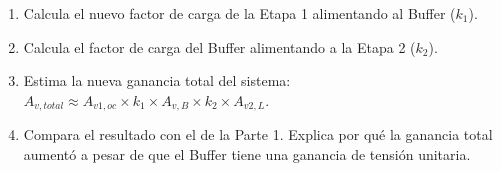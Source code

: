\documentclass[11pt, a4paper]{article}
\begin{document}
\begin{enumerate}
    \item Calcula el nuevo factor de carga de la Etapa 1 alimentando al Buffer ($k_1$).
    \item Calcula el factor de carga del Buffer alimentando a la Etapa 2 ($k_2$).
    \item Estima la nueva ganancia total del sistema: $A_{v,total} \approx A_{v1,oc} \times k_1 \times A_{v,B} \times k_2 \times A_{v2,L}$.
    \item Compara el resultado con el de la Parte 1. Explica por qué la ganancia total aumentó a pesar de que el Buffer tiene una ganancia de tensión unitaria.
\end{enumerate}
\end{document}
